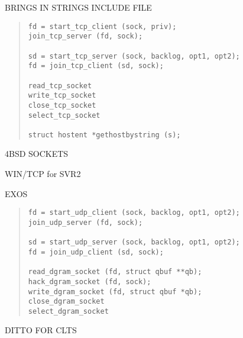 \begin{bwslide}

\begin{nrtc}
\item	BRINGS IN STRINGS INCLUDE FILE
\end{nrtc}
\end{bwslide}


\begin{bwslide}

\begin{quote}\small\begin{verbatim}
fd = start_tcp_client (sock, priv);
join_tcp_server (fd, sock);

sd = start_tcp_server (sock, backlog, opt1, opt2);
fd = join_tcp_client (sd, sock);

read_tcp_socket
write_tcp_socket
close_tcp_socket
select_tcp_socket

struct hostent *gethostbystring (s);
\end{verbatim}\end{quote}
\end{bwslide}


\begin{bwslide}

\begin{nrtc}
\item	4BSD SOCKETS

\item	WIN/TCP for SVR2

\item	EXOS
\end{nrtc}
\end{bwslide}


\begin{bwslide}

\begin{quote}\small\begin{verbatim}
fd = start_udp_client (sock, backlog, opt1, opt2);
join_udp_server (fd, sock);

sd = start_udp_server (sock, backlog, opt1, opt2);
fd = join_udp_client (sd, sock);

read_dgram_socket (fd, struct qbuf **qb);
hack_dgram_socket (fd, sock);
write_dgram_socket (fd, struct qbuf *qb);
close_dgram_socket
select_dgram_socket
\end{verbatim}\end{quote}
DITTO FOR CLTS
\end{bwslide}


